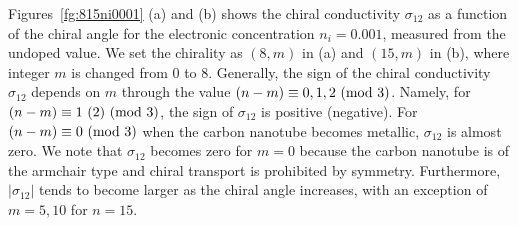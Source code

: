 \documentclass[journal=nalefd,manuscript=article,layout=twocolumn]{achemso}
\begin{document}
Figures\ \ref{fg:815ni0001} (a) and (b) shows the chiral conductivity $\sigma_{12}$ as a 
function of the chiral angle for the electronic concentration $n_i=0.001$, measured from the undoped value. 
We set the chirality as $(8,m)$ in (a) and $(15,m)$ in (b), where integer $m$ is changed from $0$ to $8$. 
Generally, the sign of the chiral conductivity $\sigma_{12}$ depends on $m$
through the value $(n-m)\equiv0,1,2\ {\rm (mod\ 3)}$. 
Namely, 
for $(n-m) \equiv1\ (2)\ {\rm (mod\ 3)}$, the sign of $\sigma_{12}$ is positive (negative).
For $(n-m)\equiv0\ {\rm (mod\ 3)}$ when the carbon nanotube becomes metallic,
$\sigma_{12}$ is almost zero. We note that $\sigma_{12}$ becomes zero for $m=0$ 
because the carbon nanotube is of the armchair type and chiral transport is 
prohibited by symmetry. 
Furthermore, 
$|\sigma_{12}|$ tends to become larger as the chiral angle increases, 
with an exception of $m=5,10$ for $n=15$.
\par
\end{document}
